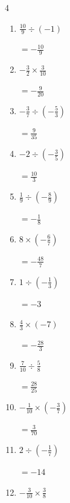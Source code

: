 \begin{multicols}{4}
\begin{enumerate}
  \item $\displaystyle \frac{10}{9}\div{}\left(-1\right)$

        $\displaystyle =-\frac{10}{9}$

  \item $\displaystyle -\frac{3}{2}\times{}\frac{3}{10}$

        $\displaystyle =-\frac{9}{20}$

  \item $\displaystyle -\frac{3}{7}\div{}\left(-\frac{5}{3}\right)$

        $\displaystyle =\frac{9}{35}$

  \item $\displaystyle -2\div{}\left(-\frac{3}{5}\right)$

        $\displaystyle =\frac{10}{3}$

  \item $\displaystyle \frac{1}{9}\div{}\left(-\frac{8}{9}\right)$

        $\displaystyle =-\frac{1}{8}$

  \item $\displaystyle 8\times{}\left(-\frac{6}{7}\right)$

        $\displaystyle =-\frac{48}{7}$

  \item $\displaystyle 1\div{}\left(-\frac{1}{3}\right)$

        $\displaystyle =-3$

  \item $\displaystyle \frac{4}{3}\times{}\left(-7\right)$

        $\displaystyle =-\frac{28}{3}$

  \item $\displaystyle \frac{7}{10}\div{}\frac{5}{8}$

        $\displaystyle =\frac{28}{25}$

\columnbreak %

  \item $\displaystyle -\frac{1}{10}\times{}\left(-\frac{3}{7}\right)$

        $\displaystyle =\frac{3}{70}$

  \item $\displaystyle 2\div{}\left(-\frac{1}{7}\right)$

        $\displaystyle =-14$

  \item $\displaystyle -\frac{3}{10}\times{}\frac{3}{8}$


\end{enumerate}
\end{multicols}
